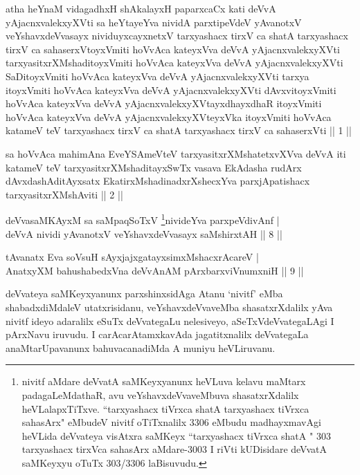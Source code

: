 
\begin{kandikeshl}
atha heYnaM vidagadhxH shAkalayxH paparxcaCx kati deVvA yAjacnxvalekxyXVti sa heYtayeYva nividA parxtipeVdeV yAvanotxV veYshavxdeVvasayx nividuyxcayxnetxV tarxyashacx tirxV ca shatA tarxyashacx tirxV ca sahaserxVtoyxVmiti hoVvAca kateyxVva deVvA yAjacnxvalekxyXVti tarxyasitxrXMshaditoyxVmiti hoVvAca kateyxVva deVvA yAjacnxvalekxyXVti SaDitoyxVmiti hoVvAca kateyxVva deVvA yAjacnxvalekxyXVti tarxya itoyxVmiti hoVvAca kateyxVva deVvA yAjacnxvalekxyXVti dAvxvitoyxVmiti hoVvAca kateyxVva deVvA yAjacnxvalekxyXVtayxdhayxdhaR itoyxVmiti hoVvAca kateyxVva deVvA yAjacnxvalekxyXVteyxVka itoyxVmiti hoVvAca katameV teV tarxyashacx tirxV ca shatA tarxyashacx tirxV ca sahaserxVti || 1 ||
\end{kandikeshl}

\begin{kandikeshl}
sa hoVvAca mahimAna EveYSAmeVteV tarxyasitxrXMshatetxvXVva deVvA iti katameV teV tarxyasitxrXMshaditayxSwTx vasava EkAdasha rudArx dAvxdashAditAyxsatx EkatirxMshadinadxrXshecxYva parxjApatishacx tarxyasitxrXMshAviti || 2 ||
\end{kandikeshl}


\begin{shl}
deVvasaMKAyxM sa saMpaqSoTxV \footnote{nivitf aMdare deVvatA saMKeyxyanunx heVLuva kelavu maMtarx padagaLeMdathaR, avu veYshavxdeVvaveMbuva shasatxrXdalilx heVLalapxTiTxve. ``tarxyashacx tiVrxca shatA tarxyashacx tiVrxca sahasArx" eMbudeV nivitf oTiTxnalilx 3306 eMbudu madhayxmavAgi heVLida deVvateya visAtxra saMKeyx ``tarxyashacx tiVrxca shatA " 303  tarxyashacx tirxVca sahasArx aMdare-3003 I riVti kUDisidare deVvatA saMKeyxyu oTuTx 303/3306 laBisuvudu.}nivideYva parxpeVdivAnf |\\
deVvA nividi yAvanotxV veYshavxdeVvasayx saMshirxtAH \hfill || 8 ||
\end{shl}

\begin{shl}
tAvanatx Eva soV\s suH sAyxjajxgatayxsimxMshacxrAcareV |\\
AnatxyXM bahushabedxVna deVvAnAM pArxbarxviVnumxniH \hfill || 9 ||
\end{shl}

\begin{artha}
deVvateya saMKeyxyanunx parxshinxsidAga Atanu `nivitf' eMba shabadxdiMdaleV utatxrisidanu, veYshavxdeVvaveMba shasatxrXdalilx yAva nivitf ideyo adaralilx eSuTx deVvategaLu nelesiveyo, aSeTxVdeVvategaLAgi I pArxNavu iruvudu. I carAcarAtamxkavAda jagatitxnalilx deVvategaLa anaMtarUpavanunx bahuvacanadiMda A muniyu heVLiruvanu.
\end{artha}%

